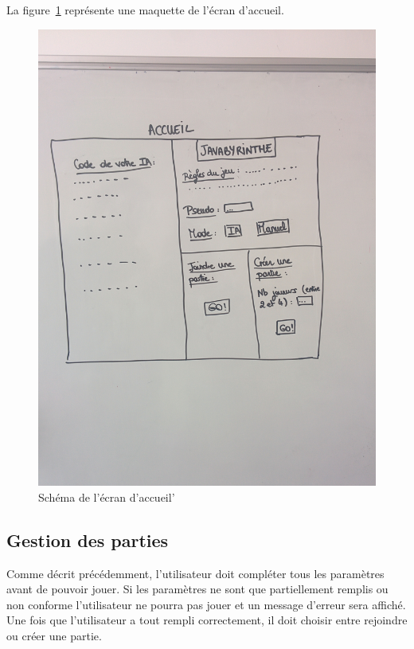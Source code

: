 	La figure~\ref{fig:ecran_accueil} représente une maquette de l'écran d'accueil.
	\begin{figure}[h]
		\centering
		\includegraphics[scale=0.2]{images/schema_ecran_accueil.jpg}
		\caption{Schéma de l'écran d'accueil'}
		\label{fig:ecran_accueil}
	\end{figure}

	\subsection{Gestion des parties}
		Comme décrit précédemment, l'utilisateur doit compléter tous les paramètres avant de pouvoir jouer. Si les paramètres ne sont que partiellement remplis ou non conforme l'utilisateur ne pourra pas jouer et un message d'erreur sera affiché. Une fois que l'utilisateur a tout rempli correctement, il doit choisir entre rejoindre ou créer une partie.

